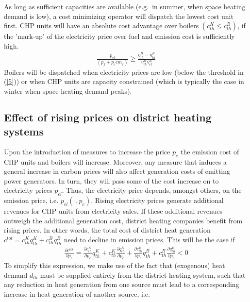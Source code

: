 \documentclass[preprint, 12pt, authoryear]{elsarticle}
\begin{document}
As long as sufficient capacities are available (e.g.~in summer, when space heating demand is low), a cost minimizing operator will dispatch the lowest cost unit first.
CHP units will have an absolute cost advantage over boilers $(c_{th}^{K} \leq c_{th}^{B})$, if the 'mark-up' of the electricity price over fuel and  emission cost is sufficiently high.
\begin{align}\label{5}
\frac{p_{el}}{(p_{f} + p_{e} em_{f})} \geq \frac{\eta_{th}^{B} - \eta_{th}^{K}}{\eta_{th}^{B} \eta_{el}^{K}}
\end{align}
Boilers will be dispatched when electricity prices are low (below the threshold in (\ref{5})) or when CHP units are capacity constrained (which is typically the case in winter when space heating demand peaks).

\subsection{Effect of rising  prices on district heating systems} \label{CO2DHeffect}
Upon the introduction of measures to increase the price $p_{e}$ the  emission cost of CHP units and boilers will increase.
Moreover, any measure that induces a general increase in carbon prices will also affect generation costs of  emitting power generators. In turn, they will pass some of the cost increase on to electricity prices $p_{el}$.
Thus, the electricity price depends, amongst others, on the emission price, i.e. $p_{el}(\cdot, p_{e})$.
Rising electricity prices generate additional revenues for CHP units from electricity sales.
If these additional revenues outweigh the additional generation cost, district heating companies benefit from rising  prices.
In other words, the total cost of district heat generation $c^{tot} = c_{th}^{K} q_{th}^{K} + c_{th}^{B} q_{th}^{B}$ need to decline in emission prices.
This will be the case if
\begin{align}\label{6}
\frac{\partial c^{tot}}{\partial p_{e}} = \frac{\partial c_{th}^{K}}{\partial p_{e}} q_{th}^{K} + c_{th}^{K}
\frac{\partial q_{th}^K}{\partial p_e} + \frac{\partial c_{th}^{B}}{\partial p_{e}} q_{th}^{B} +c_{th}^{B}
\frac{\partial q_{th}^{B}}{\partial p_{e}} < 0
\end{align}
To simplify this expression, we make use of the fact that (exogenous) heat demand $d_{th}$ must be supplied entirely from the district heating system, such that any reduction in heat generation from one source must lead to a corresponding increase in heat generation of another source, i.e.
\end{document}
